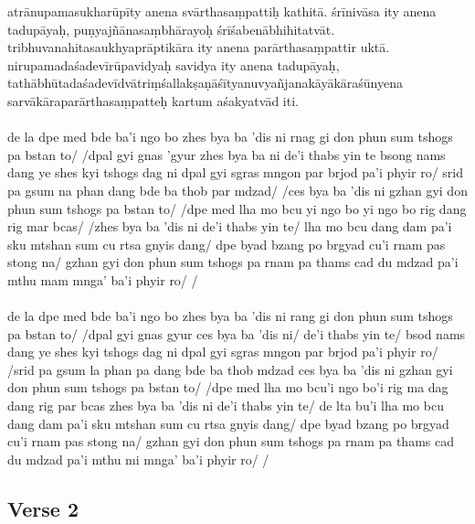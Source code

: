 \documentclass[12pt]{article}
\begin{document}
atrānupamasukharūpīty anena svārthasaṃpattiḥ kathitā.
śrīnivāsa ity anena tadupāyaḥ, puṇyajñānasaṃbhārayoḥ śrīśabenābhihitatvāt.
tribhuvanahitasaukhyaprāptikāra ity anena parārthasaṃpattir uktā.
nirupamadaśadevīrūpavidyaḥ savidya ity anena tadupāyaḥ, tathābhūtadaśadevīdvātriṃśallakṣaṇāśītyanuvyañjanakāyākāraśūnyena sarvākāraparārthasaṃpatteḥ kartum aśakyatvād iti.\\

\textbf{\TVA}\\
de la dpe med bde ba'i ngo bo zhes bya ba 'dis ni rnag gi don phun sum tshogs pa bstan to/ /dpal gyi gnas 'gyur zhes bya ba ni de'i thabs yin te bsong nams dang ye shes kyi tshogs dag ni dpal gyi sgras mngon par brjod pa'i phyir ro/ srid pa gsum na phan dang bde ba thob par mdzad/ /ces bya ba 'dis ni gzhan gyi don phun sum tshogs pa bstan to/ /dpe med lha mo bcu yi ngo bo yi ngo bo rig dang rig mar bcas/ /zhes bya ba 'dis ni de'i thabs yin te/ lha mo bcu dang dam pa'i sku mtshan sum cu rtsa gnyis dang/ dpe byad bzang po brgyad cu'i rnam pas stong na/ gzhan gyi don phun sum tshogs pa rnam pa thams cad du mdzad pa'i mthu mam mnga' ba'i phyir ro/ /\\

\textbf{\TVB}\\
de la dpe med bde ba'i ngo bo zhes bya ba 'dis ni rang gi don phun sum tshogs pa bstan to/ /dpal gyi gnas gyur ces bya ba 'dis ni/ de'i thabs yin te/ bsod nams dang ye shes kyi tshogs dag ni dpal gyi sgras mngon par brjod pa'i phyir ro/ /srid pa gsum la phan pa dang bde ba thob mdzad ces bya ba 'dis ni gzhan gyi don phun sum tshogs pa bstan to/ /dpe med lha mo bcu'i ngo bo'i rig ma dag dang rig par bcas zhes bya ba 'dis ni de'i thabs yin te/ de lta bu'i lha mo bcu dang dam pa'i sku mtshan sum cu rtsa gnyis dang/ dpe byad bzang po brgyad cu'i rnam pas stong na/ gzhan gyi don phun sum tshogs pa rnam pa thams cad du mdzad pa'i mthu mi mnga' ba'i phyir ro/ /

\subsection{Verse 2}
\end{document}
